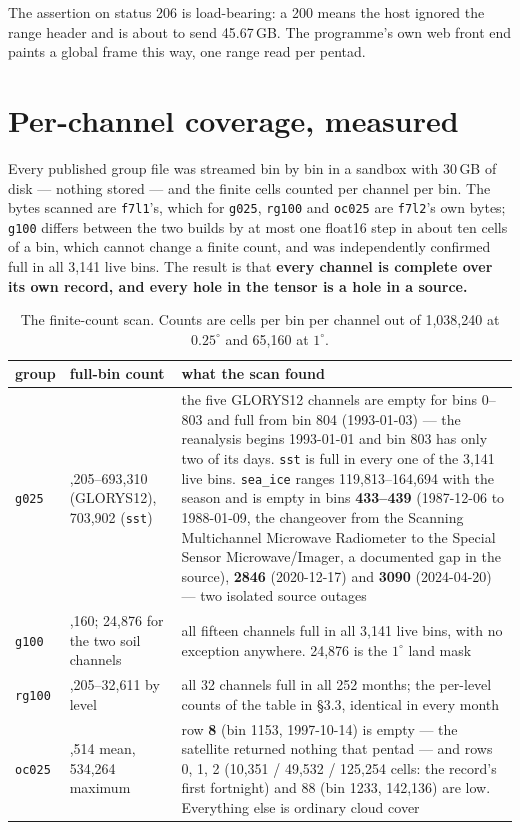 \documentclass[10pt]{article}
\newcommand{\code}[1]{\texttt{#1}}
\begin{document}
The assertion on status 206 is load-bearing: a 200 means the host ignored the
range header and is about to send 45.67\,GB. The programme's own web front end
paints a global frame this way, one range read per pentad.

\section{Per-channel coverage, measured}

Every published group file was streamed bin by bin in a sandbox with 30\,GB of
disk --- nothing stored --- and the finite cells counted per channel per bin.
The bytes scanned are \code{f7l1}'s, which for \code{g025}, \code{rg100} and
\code{oc025} are \code{f7l2}'s own bytes; \code{g100} differs between the two
builds by at most one float16 step in about ten cells of a bin, which cannot
change a finite count, and was independently confirmed full in all 3,141 live
bins. The result is that \textbf{every channel is complete over its own
record, and every hole in the tensor is a hole in a source.}

\begin{table}[h]
\centering\setlength{\tabcolsep}{4pt}\footnotesize
\begin{tabular}{@{}l>{\raggedright\arraybackslash}p{3.1cm}>{\raggedright\arraybackslash}p{9.6cm}@{}}
\toprule
group & full-bin count & what the scan found \\
\midrule
\code{g025} & 693,205--693,310 (GLORYS12), 703,902 (\code{sst}) &
the five GLORYS12 channels are empty for bins 0--803 and full from bin 804
(1993-01-03) --- the reanalysis begins 1993-01-01 and bin 803 has only two of
its days. \code{sst} is full in every one of the 3,141 live bins.
\code{sea\_ice} ranges 119,813--164,694 with the season and is empty in bins
\textbf{433--439} (1987-12-06 to 1988-01-09, the changeover from the Scanning Multichannel
Microwave Radiometer to the Special Sensor Microwave/Imager, a documented gap
in the source), \textbf{2846} (2020-12-17) and
\textbf{3090} (2024-04-20) --- two isolated source outages \\
\addlinespace
\code{g100} & 65,160; 24,876 for the two soil channels &
all fifteen channels full in all 3,141 live bins, with no exception anywhere.
24,876 is the $1^\circ$ land mask \\
\addlinespace
\code{rg100} & 31,205--32,611 by level &
all 32 channels full in all 252 months; the per-level counts of the table in
\S3.3, identical in every month \\
\addlinespace
\code{oc025} & 428,514 mean, 534,264 maximum &
row \textbf{8} (bin 1153, 1997-10-14) is empty --- the satellite returned
nothing that pentad --- and rows 0, 1, 2 (10,351 / 49,532 / 125,254 cells:
the record's first fortnight) and 88 (bin 1233, 142,136) are low. Everything
else is ordinary cloud cover \\
\bottomrule
\end{tabular}
\caption{The finite-count scan. Counts are cells per bin per channel out of
1,038,240 at $0.25^\circ$ and 65,160 at $1^\circ$.}
\end{table}
\end{document}
